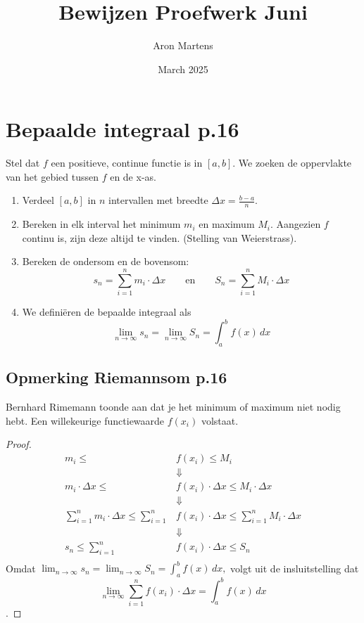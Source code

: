 \documentclass{article}
\title{Bewijzen Proefwerk Juni}
\author{Aron Martens}
\date{March 2025}
\begin{document}
\maketitle

\section{Bepaalde integraal p.16}
Stel dat $f$ een positieve, continue functie is in $\left[a,b\right]$. We zoeken de oppervlakte van het gebied tussen $f$ en de x-as.
\begin{enumerate}
  \item Verdeel $\left[a,b\right]$ in $n$ intervallen met breedte $\Delta{x}=\frac{b-a}{n}.$
  \item Bereken in elk interval het minimum $m_i$ en maximum $M_i$. Aangezien $f$ continu is, zijn deze altijd te vinden. (Stelling van Weierstrass).
  \item Bereken de ondersom en de bovensom: $$s_n=\sum_{i=1}^{n}m_i\cdot \Delta{x}\quad\quad \text{en} \quad\quad S_n=\sum_{i=1}^{n}M_i\cdot \Delta{x}$$
  \item We definiëren de bepaalde integraal als $$\lim_{n\to \infty }s_n = \lim_{n\to\infty}S_n=\int_a^bf(x)\,dx$$
\end{enumerate}

\subsection{Opmerking Riemannsom p.16}
Bernhard Rimemann toonde aan dat je het minimum of maximum niet nodig hebt. Een willekeurige functiewaarde $f\left(x_i\right)$ volstaat.
\begin{proof}
  \begin{align*}
  m_i \leq &f\left(x_i\right) \leq M_i\\
           &\Downarrow \\
  m_i \cdot \Delta{x} \leq &f\left(x_i\right) \cdot \Delta{x}\leq M_i\cdot \Delta{x}\\
                           &\Downarrow \\
  \sum_{i=1}^{n}m_i\cdot \Delta x \leq \sum_{i=1}^{n} &f\left(x_i\right)\cdot \Delta x \leq \sum_{i=1}^{n} M_i \cdot \Delta{x}\\
                                                      &\Downarrow \\
  s_n \leq \sum_{i=1}^{n} &f\left(x_i\right) \cdot \Delta x \leq S_n\\
  \end{align*}
  Omdat $\displaystyle\lim_{n\to \infty}s_n = \displaystyle\lim_{n\to\infty}S_n = \displaystyle\int_{a}^{b}f(x)\,dx,$ volgt uit de insluitstelling dat
  $$\lim_{n\to\infty}\sum_{i=1}^{n}f(x_i)\cdot \Delta x = \displaystyle\int_{a}^{b}f(x)\,dx$$.
\end{proof}
\end{document}
